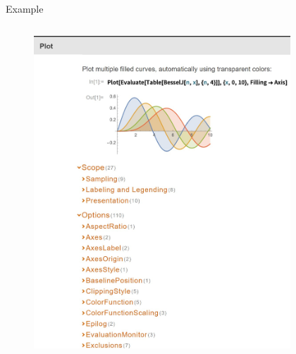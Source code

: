 \documentclass{beamer}
\begin{document}
\begin{frame}{Example}
    \begin{columns}
        \begin{column}{0.5\linewidth}
            \begin{figure}[htbp]
                \centering
                \includegraphics[width=\textwidth]{img/mma_plot.jpg}
            \end{figure}
        \end{column}
        \begin{column}{0.5\linewidth}
            \begin{figure}[htbp]
                \centering

\end{figure}
\end{column}
\end{columns}
\end{frame}
\end{document}
